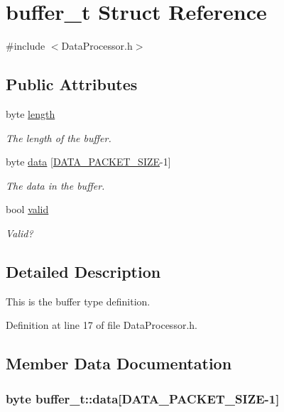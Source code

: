 \hypertarget{structbuffer__t}{\section{buffer\-\_\-t \-Struct \-Reference}
\label{structbuffer__t}
}


{\ttfamily \#include $<$\-Data\-Processor.\-h$>$}

\subsection*{\-Public \-Attributes}
\begin{DoxyCompactItemize}
\item 
byte \hyperlink{structbuffer__t_a5f6ea3ee1957ac885233051495e45596}{length}
\begin{DoxyCompactList}\small\item\em \-The length of the buffer. \end{DoxyCompactList}\item 
byte \hyperlink{structbuffer__t_a80a3068db268edaeabb9a750d5c40f50}{data} \mbox{[}\hyperlink{_a_d_s1298_driver_8h_abb59a566539e5e148f63599ee6e67ea1}{\-D\-A\-T\-A\-\_\-\-P\-A\-C\-K\-E\-T\-\_\-\-S\-I\-Z\-E}-\/1\mbox{]}
\begin{DoxyCompactList}\small\item\em \-The data in the buffer. \end{DoxyCompactList}\item 
bool \hyperlink{structbuffer__t_ab8c6d50976afb6e0717a0dc6e6bde41c}{valid}
\begin{DoxyCompactList}\small\item\em \-Valid? \end{DoxyCompactList}\end{DoxyCompactItemize}


\subsection{\-Detailed \-Description}
\-This is the buffer type definition. 

\-Definition at line 17 of file \-Data\-Processor.\-h.



\subsection{\-Member \-Data \-Documentation}
\hypertarget{structbuffer__t_a80a3068db268edaeabb9a750d5c40f50}{
\subsubsection[{data}]{\setlength{\rightskip}{0pt plus 5cm}byte {\bf buffer\-\_\-t\-::data}\mbox{[}{\bf \-D\-A\-T\-A\-\_\-\-P\-A\-C\-K\-E\-T\-\_\-\-S\-I\-Z\-E}-\/1\mbox{]}}}\label{structbuffer__t_a80a3068db268edaeabb9a750d5c40f50}


